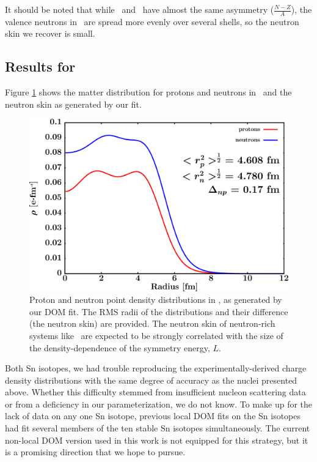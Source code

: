 It should be noted that while \snTwelve\ and \oEight\ have almost the same asymmetry
($\frac{N-Z}{A}$), the valence neutrons in \snTwelve\ are spread more evenly over several
shells, so the neutron skin we recover is small.

\subsection{Results for \snFour}
Figure \ref{Sn124MatterDistribution} shows the matter distribution for protons and neutrons in
\snFour\ and the neutron skin as generated by our fit.
\begin{figure}[tb]
    \centering
    \includegraphics[width=\textwidth]{figures/sn124_matterDensity.png}
    \caption[Proton and neutron matter density distributions in \snFour]
    {
        Proton and neutron point density distributions in \snFour, as
        generated by our DOM fit. The RMS radii of the distributions and their
        difference (the neutron skin) are provided. The neutron skin of
        neutron-rich systems like \snFour\ are expected to be strongly correlated
        with the size of the density-dependence of the symmetry energy, $L$.
    }
    \label{Sn124MatterDistribution}
\end{figure}
Both Sn isotopes, we had trouble
reproducing the experimentally-derived charge density distributions with
the same degree of accuracy as the nuclei presented above.
Whether this difficulty stemmed from insufficient nucleon scattering
data or from a deficiency in our parameterization, we do not know. To make up for the lack of data
on any one Sn isotope, previous local DOM fits on the Sn isotopes \cite{Charity2006, Mueller2011}
had fit several members of the ten stable Sn isotopes simultaneously.
The current non-local DOM version used in this work is not equipped for this strategy, but it is a
promising direction that we hope to pursue.

